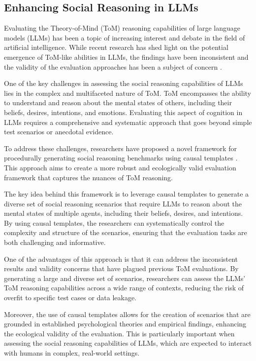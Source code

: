 \documentclass[11pt]{article}
\begin{document}
\subsection{Enhancing Social Reasoning in LLMs}

Evaluating the Theory-of-Mind (ToM) reasoning capabilities of large language models (LLMs) has been a topic of increasing interest and debate in the field of artificial intelligence. While recent research has shed light on the potential emergence of ToM-like abilities in LLMs, the findings have been inconsistent and the validity of the evaluation approaches has been a subject of concern \cite{ref344,ref345}.

One of the key challenges in assessing the social reasoning capabilities of LLMs lies in the complex and multifaceted nature of ToM. ToM encompasses the ability to understand and reason about the mental states of others, including their beliefs, desires, intentions, and emotions. Evaluating this aspect of cognition in LLMs requires a comprehensive and systematic approach that goes beyond simple test scenarios or anecdotal evidence.

To address these challenges, researchers have proposed a novel framework for procedurally generating social reasoning benchmarks using causal templates \cite{ref346,ref347}. This approach aims to create a more robust and ecologically valid evaluation framework that captures the nuances of ToM reasoning.

The key idea behind this framework is to leverage causal templates to generate a diverse set of social reasoning scenarios that require LLMs to reason about the mental states of multiple agents, including their beliefs, desires, and intentions. By using causal templates, the researchers can systematically control the complexity and structure of the scenarios, ensuring that the evaluation tasks are both challenging and informative.

One of the advantages of this approach is that it can address the inconsistent results and validity concerns that have plagued previous ToM evaluations. By generating a large and diverse set of scenarios, researchers can assess the LLMs' ToM reasoning capabilities across a wide range of contexts, reducing the risk of overfit to specific test cases or data leakage.

Moreover, the use of causal templates allows for the creation of scenarios that are grounded in established psychological theories and empirical findings, enhancing the ecological validity of the evaluation. This is particularly important when assessing the social reasoning capabilities of LLMs, which are expected to interact with humans in complex, real-world settings.
\end{document}
